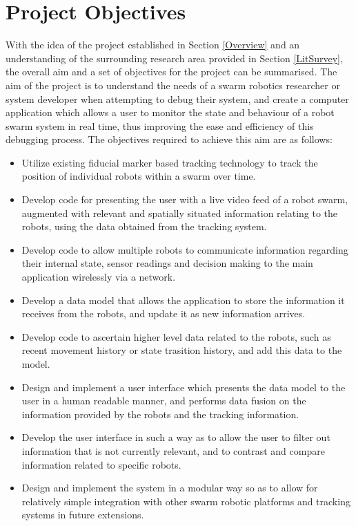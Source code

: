 \documentclass[hidelinks,10pt]{article}
\begin{document}
\newpage
\section{Project Objectives} \label{Objectives}
With the idea of the project established in Section \ref{Overview} and an understanding of the surrounding research area provided in Section \ref{LitSurvey}, the overall aim and a set of objectives for the project can be summarised. The aim of the project is to understand the needs of a swarm robotics researcher or system developer when attempting to debug their system, and create a computer application which allows a user to monitor the state and behaviour of a robot swarm system in real time, thus improving the ease and efficiency of this debugging process. The objectives required to achieve this aim are as follows:

\begin{itemize}
	\item Utilize existing fiducial marker based tracking technology to track the position of individual robots within a swarm over time.
	\item Develop code for presenting the user with a live video feed of a robot swarm, augmented with relevant and spatially situated information relating to the robots, using the data obtained from the tracking system.
	\item Develop code to allow multiple robots to communicate information regarding their internal state, sensor readings and decision making to the main application wirelessly via a network.
	\item Develop a data model that allows the application to store the information it receives from the robots, and update it as new information arrives.
	\item Develop code to ascertain higher level data related to the robots, such as recent movement history or state trasition history, and add this data to the model.
	\item Design and implement a user interface which presents the data model to the user in a human readable manner, and performs data fusion on the information provided by the robots and the tracking information.
	\item Develop the user interface in such a way as to allow the user to filter out information that is not currently relevant, and to contrast and compare information related to specific robots.
	\item Design and implement the system in a modular way so as to allow for relatively simple integration with other swarm robotic platforms and tracking systems in future extensions.
\end{itemize}
\end{document}
